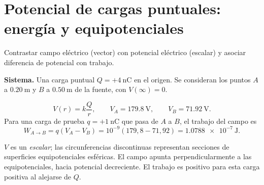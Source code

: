 \documentclass[11pt,a4paper]{article}
\newcommand{\ej}[2]{\clearpage\section{#2}}
\begin{document}
\ej{3}{Potencial de cargas puntuales: energía y equipotenciales}
\begin{objetivo}Contrastar campo eléctrico (vector) con potencial eléctrico (escalar) y asociar diferencia de potencial con trabajo.\end{objetivo}
\textbf{Sistema.} Una carga puntual $Q=+\SI{4}{\nano\coulomb}$ en el origen. Se consideran los puntos $A$ a $\SI{0.20}{\metre}$ y $B$ a $\SI{0.50}{\metre}$ de la fuente, con $V(\infty)=0$.
\begin{center}\end{center}
\begin{metodo}
\[V(r)=k\frac{Q}{r},\qquad V_A=\SI{179.8}{\volt},\qquad V_B=\SI{71.92}{\volt}.\]
Para una carga de prueba $q=+\SI{1}{\nano\coulomb}$ que pasa de $A$ a $B$, el trabajo del campo es
\[W_{A\to B}=q(V_A-V_B)=10^{-9}(179{,}8-71{,}92)=\SI{1.0788e-7}{\joule}.\]
\end{metodo}
\begin{resultado}$V$ es un \emph{escalar}; las circunferencias discontinuas representan secciones de superficies equipotenciales esféricas. El campo apunta perpendicularmente a las equipotenciales, hacia potencial decreciente. El trabajo es positivo para esta carga positiva al alejarse de $Q$.\end{resultado}
\end{document}
